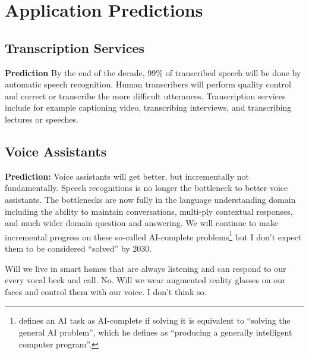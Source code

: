 \section{Application Predictions}
\label{sec:application_predictions}

\subsection{Transcription Services}

{\bf Prediction} By the end of the decade, 99\% of transcribed speech will be
done by automatic speech recognition. Human transcribers will perform quality
control and correct or transcribe the more difficult utterances. Transcription
services include for example captioning video, transcribing interviews, and
transcribing lectures or speeches.

\subsection{Voice Assistants}

{\bf Prediction:} Voice assistants will get better, but incrementally not
fundamentally. Speech recognitions is no longer the bottleneck to better voice
assistants. The bottlenecks are now fully in the language understanding domain
including the ability to maintain conversations, multi-ply contextual
responses, and much wider domain question and answering. We will continue to
make incremental progress on these so-called AI-complete
problems\footnote{\citet[sec. 4]{shapiro1992encyclopedia} defines an AI task as
AI-complete if solving it is equivalent to ``solving the general AI problem'',
which he defines as ``producing a generally intelligent computer program''.}
but I don't expect them to be considered ``solved'' by 2030.

Will we live in smart homes that are always listening and can respond to our
every vocal beck and call. No. Will we wear augmented reality glasses on our
faces and control them with our voice. I don't think so.

